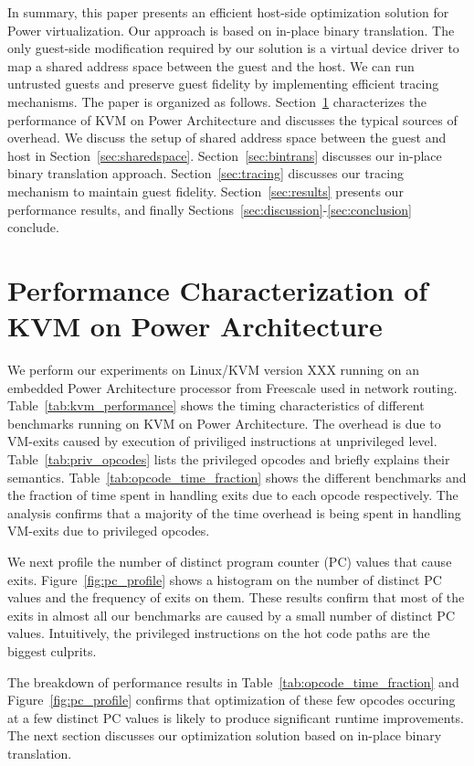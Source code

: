 \documentclass[10pt,twocolumn]{article}
\begin{document}
In summary, this paper presents an efficient host-side optimization solution for
Power virtualization. Our approach is based on in-place binary translation.
The only guest-side modification required by our solution is a virtual
device driver to map a shared address space between the guest and the host.
We can run untrusted guests and preserve guest fidelity by implementing efficient
tracing mechanisms.
The paper is organized as
follows. Section~\ref{sec:performance_char} characterizes the performance of
KVM on Power Architecture and discusses the typical sources of overhead.
We discuss the setup of shared address space between the guest and host
in Section~\ref{sec:sharedspace}.
Section~\ref{sec:bintrans} discusses our in-place binary translation approach.
Section~\ref{sec:tracing} discusses our tracing mechanism to maintain guest fidelity.
Section~\ref{sec:results} presents our performance results, and
finally Sections~\ref{sec:discussion}-\ref{sec:conclusion} conclude.

\section{Performance Characterization of KVM on Power Architecture}
\label{sec:performance_char}
We perform our experiments on Linux/KVM version XXX running on an
embedded Power Architecture processor from Freescale used in network
routing.
Table~\ref{tab:kvm_performance} shows the timing characteristics of
different benchmarks running on KVM on Power Architecture. The
overhead is due to VM-exits caused by execution of priviliged instructions
at unprivileged level. Table~\ref{tab:priv_opcodes} lists the privileged
opcodes and briefly explains their semantics.
Table~\ref{tab:opcode_time_fraction} shows
the different benchmarks and the fraction of time spent in handling
exits due to each opcode respectively. The analysis confirms that a
majority of the time overhead is being spent in handling VM-exits due
to privileged opcodes.

We next profile the number of distinct program counter (PC) values that
cause exits. Figure~\ref{fig:pc_profile} shows a histogram on the number
of distinct PC values and the frequency of exits on them. These results
confirm that most of the exits in almost all our benchmarks are caused
by a small number of distinct PC values. Intuitively, the privileged
instructions on the hot code paths are the biggest culprits.

The breakdown of performance results in Table~\ref{tab:opcode_time_fraction}
and Figure~\ref{fig:pc_profile} confirms that optimization of these
few opcodes occuring at a few distinct PC values is likely to produce
significant runtime improvements. The next section discusses our
optimization solution based on in-place binary translation.
\end{document}
